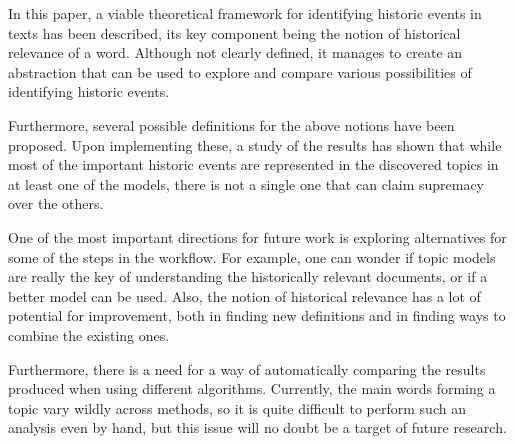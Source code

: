 
In this paper, a viable theoretical framework for identifying historic events in texts has been described, its key component being the notion of historical relevance of a word. Although not clearly defined, it manages to create an abstraction that can be used to explore and compare various possibilities of identifying historic events.

Furthermore, several possible definitions for the above notions have been proposed. Upon implementing these, a study of the results has shown that while most of the important historic events are represented in the discovered topics in at least one of the models, there is not a single one that can claim supremacy over the others.

One of the most important directions for future work is exploring alternatives for some of the steps in the workflow. For example, one can wonder if topic models are really the key of understanding the historically relevant documents, or if a better model can be used. Also, the notion of historical relevance has a lot of potential for improvement, both in finding new definitions and in finding ways to combine the existing ones.

Furthermore, there is a need for a way of automatically comparing the results produced when using different algorithms. Currently, the main words forming a topic vary wildly across methods, so it is quite difficult to perform such an analysis even by hand, but this issue will no doubt be a target of future research.
